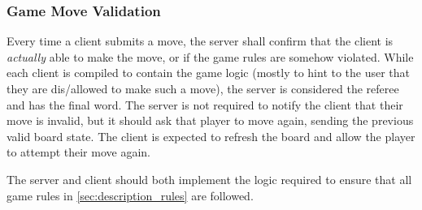 \documentclass[letterpaper]{article}
\begin{document}
\subsubsection{Game Move Validation}
\label{sec:fun_reqs_server_validation}

Every time a client submits a move, the server shall confirm
that the client is \emph{actually} able to make the move, or if
the game rules are somehow violated. While each client is
compiled to contain the game logic (mostly to hint to the user
that they are dis/allowed to make such a move), the server is
considered the referee and has the final word. The server is not
required to notify the client that their move is invalid, but
it should ask that player to move again, sending the previous
valid board state. The client is expected to refresh the board
and allow the player to attempt their move again.

The server and client should both implement the logic required
to ensure that all game rules in \cref{sec:description_rules}
are followed.
\end{document}
